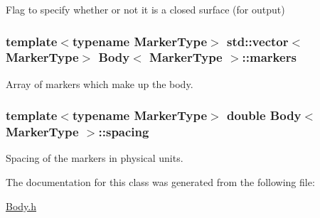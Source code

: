 Flag to specify whether or not it is a closed surface (for output) 

\subsubsection[{\texorpdfstring{markers}{markers}}]{\setlength{\rightskip}{0pt plus 5cm}template$<$typename Marker\+Type$>$ std\+::vector$<$Marker\+Type$>$ {\bf Body}$<$ Marker\+Type $>$\+::markers\hspace{0.3cm}{\ttfamily [protected]}}\hypertarget{class_body_a4e0ac821f2331ec67793a44e36c855e3}{}\label{class_body_a4e0ac821f2331ec67793a44e36c855e3}


Array of markers which make up the body. 

\subsubsection[{\texorpdfstring{spacing}{spacing}}]{\setlength{\rightskip}{0pt plus 5cm}template$<$typename Marker\+Type$>$ double {\bf Body}$<$ Marker\+Type $>$\+::spacing\hspace{0.3cm}{\ttfamily [protected]}}\hypertarget{class_body_a1d4ac2e6fdbc946d5eab0973fd78770b}{}\label{class_body_a1d4ac2e6fdbc946d5eab0973fd78770b}


Spacing of the markers in physical units. 



The documentation for this class was generated from the following file\+:\begin{DoxyCompactItemize}
\item 
\hyperlink{_body_8h}{Body.\+h}\end{DoxyCompactItemize}
